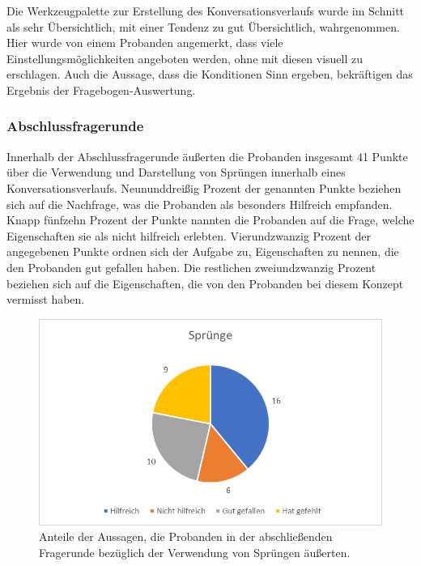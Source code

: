Die Werkzeugpalette zur Erstellung des Konversationsverlaufs wurde im Schnitt als sehr Übersichtlich, mit einer Tendenz zu gut Übersichtlich, wahrgenommen. Hier wurde von einem Probanden angemerkt, dass viele Einstellungsmöglichkeiten angeboten werden, ohne mit diesen visuell zu erschlagen. Auch die Aussage, dass die Konditionen Sinn ergeben, bekräftigen das Ergebnis der Fragebogen-Auswertung. 

\subsubsection{Abschlussfragerunde}
Innerhalb der Abschlussfragerunde äußerten die Probanden insgesamt 41 Punkte über die Verwendung und Darstellung von Sprüngen innerhalb eines Konversationsverlaufs. Neununddreißig Prozent der genannten Punkte beziehen sich auf die Nachfrage, was die Probanden als besonders Hilfreich empfanden. Knapp fünfzehn Prozent der Punkte nannten die Probanden auf die Frage, welche Eigenschaften sie als nicht hilfreich erlebten. Vierundzwanzig Prozent der angegebenen Punkte ordnen sich der Aufgabe zu, Eigenschaften zu nennen, die den Probanden gut gefallen haben. Die restlichen zweiundzwanzig Prozent beziehen sich auf die Eigenschaften, die von den Probanden bei diesem Konzept vermisst haben.  

\begin{figure}[h]
\centering
\includegraphics[width=1\textwidth]{pictures/diagramme/aussagenspr}
\caption{Anteile der Aussagen, die Probanden in der abschließenden Fragerunde bezüglich der Verwendung von Sprüngen äußerten.}
\label{aussagensichtb}
\end{figure}
 


